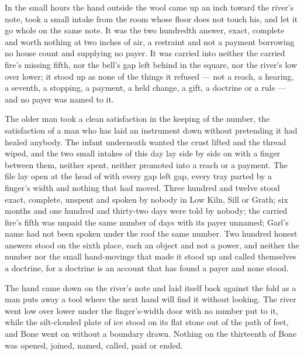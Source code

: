 In the small hours the hand outside the wool came up an inch toward the river's note, took a small intake from the room whose floor does not touch his, and let it go whole on the same note. It was the two hundredth answer, exact, complete and worth nothing at two inches of air, a restraint and not a payment borrowing no house count and supplying no payer. It was carried into neither the carried fire's missing fifth, nor the bell's gap left behind in the square, nor the river's low over lower; it stood up as none of the things it refused --- not a reach, a hearing, a seventh, a stopping, a payment, a held change, a gift, a doctrine or a rule --- and no payer was named to it.

The older man took a clean satisfaction in the keeping of the number, the satisfaction of a man who has laid an instrument down without pretending it had healed anybody. The infant underneath wanted the crust lifted and the thread wiped, and the two small intakes of this day lay side by side on  with a finger between them, neither spent, neither promoted into a reach or a payment. The file lay open at the head of  with every gap left gap, every tray parted by a finger's width and nothing that had moved. Three hundred and twelve stood exact, complete, unspent and spoken by nobody in Low Kiln, Sill or Grath; six months and one hundred and thirty-two days were told by nobody; the carried fire's fifth was unpaid the same number of days with its payer unnamed; Garl's name had not been spoken under the roof the same number. Two hundred honest answers stood on the sixth place, each an object and not a power, and neither the number nor the small hand-movings that made it stood up and called themselves a doctrine, for a doctrine is an account that has found a payer and none stood.

The hand came down on the river's note and laid itself back against the fold as a man puts away a tool where the next hand will find it without looking. The river went low over lower under the finger's-width door with no number put to it, while the silt-clouded plate of ice stood on its flat stone out of the path of feet, and Bone went on without a boundary drawn. Nothing on the thirteenth of Bone was opened, joined, named, called, paid or ended.
